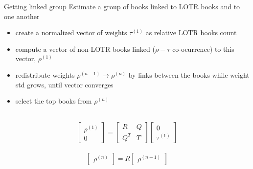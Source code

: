 \documentclass[9pt]{beamer}
\begin{document}
\begin{frame}{Getting linked group}
	Estimate a group of books linked to LOTR books and to one another
	\begin{itemize}
		\item create a normalized vector of weights $\tau^{(1)}$ as relative LOTR books count
		\item compute a vector of non-LOTR books linked ($\rho{-}\tau$ co-ocurrence) to this vector, $\rho^{(1)}$
		\item redistribute weights $\rho^{(n-1)} \rightarrow \rho^{(n)}$  by links between the books while weight std grows, until vector converges
		\item select the top books from $\rho^{(n)}$
	\end{itemize}
	\\[1em]
	\begin{equation*}
		\begin{bmatrix}
			\rho^{(1)} \\
			0
		\end{bmatrix}
		=
		\begin{bmatrix}
			R & Q \\
			Q^T  & T
		\end{bmatrix}
		\begin{bmatrix}
			0  \\
			\tau^{(1)}
		\end{bmatrix}
	\end{equation*}	
	\\[1em]
	\begin{equation*}
		\begin{bmatrix}
			\rho^{(n)}
		\end{bmatrix}
		= R
		\begin{bmatrix}
			\rho^{(n-1)}
		\end{bmatrix}
	\end{equation*}
\end{frame}
\end{document}
